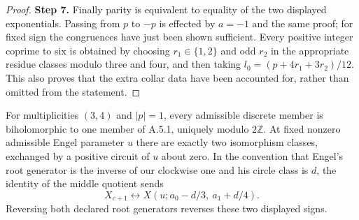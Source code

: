 \begin{proof}
\par\smallskip\noindent\textbf{Step 7.} Finally parity is equivalent to equality of the two displayed exponentials. Passing from $p$ to $-p$ is effected by $a=-1$ and the same proof; for fixed sign the congruences have just been shown sufficient. Every positive integer coprime to six is obtained by choosing $r_1\in\{1,2\}$ and odd $r_2$ in the appropriate residue classes modulo three and four, and then taking $l_0=(p+4r_1+3r_2)/12$. This also proves that the extra collar data have been accounted for, rather than omitted from the statement.
\end{proof}
\begin{proposition}[FAM B.2.2; T]\label{fam:B.2.2}
For multiplicities $(3,4)$ and $|p|=1$, every admissible discrete member is biholomorphic to one member of A.5.1, uniquely modulo $2\mathbb Z$. At fixed nonzero admissible Engel parameter $u$ there are exactly two isomorphism classes, exchanged by a positive circuit of $u$ about zero. In the convention that Engel's root generator is the inverse of our clockwise one and his circle class is $d$, the identity of the middle quotient sends
\[
 X_{c+1}\longleftrightarrow X(u;a_0-d/3,\ a_1+d/4).
\]
Reversing both declared root generators reverses these two displayed signs.
\end{proposition}
